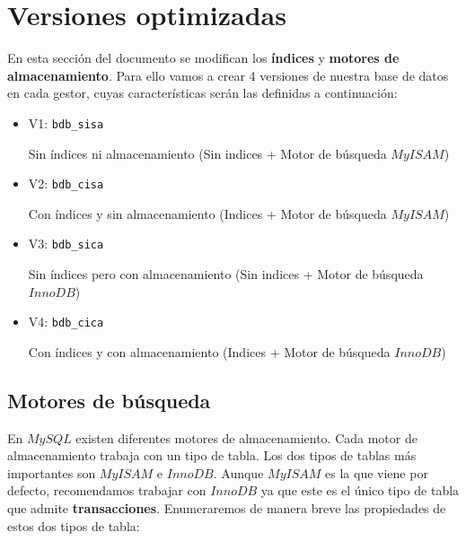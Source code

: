\documentclass[12pt,a4paper]{article}
\begin{document}

\newpage
\section{Versiones optimizadas} \label{pto3} 

En esta sección del documento se modifican los \textbf{índices} y \textbf{motores de almacenamiento}. Para ello vamos a crear 4 versiones de nuestra base de datos en cada gestor, cuyas características serán las definidas a continuación:

\begin{itemize}
\item V1: \verb|bdb_sisa|

 Sin índices ni almacenamiento (Sin indices + Motor de búsqueda $MyISAM$)
\item V2: \verb|bdb_cisa|

Con índices y sin almacenamiento (Indices + Motor de búsqueda $MyISAM$)

\item V3: \verb|bdb_sica|

Sin índices pero con almacenamiento (Sin indices + Motor de búsqueda $InnoDB$)

\item V4: \verb|bdb_cica|

Con índices y con almacenamiento (Indices + Motor de búsqueda $InnoDB$)
\end{itemize}



\subsection{Motores de búsqueda} \label{pto31}

En $MySQL$ existen diferentes motores de almacenamiento. Cada motor de almacenamiento trabaja con un tipo de tabla. Los dos tipos de tablas más importantes son $MyISAM$ e $InnoDB$. Aunque $MyISAM$ es la que viene por defecto, recomendamos trabajar con $InnoDB$ ya que este es el único tipo de tabla que admite \textbf{transacciones}. Enumeraremos de manera breve las propiedades de estos dos tipos de tabla:
\end{document}
